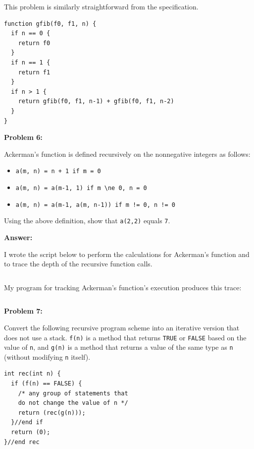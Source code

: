 \documentclass[10pt,letterpaper,final]{report}
\begin{document}
This problem is similarly straightforward from the specification.

\begin{mdframed}
\begin{verbatim}
function gfib(f0, f1, n) {
  if n == 0 {
    return f0
  }   
  if n == 1 {
    return f1
  }   
  if n > 1 {
    return gfib(f0, f1, n-1) + gfib(f0, f1, n-2)
  }       
}
\end{verbatim}
\end{mdframed}

\pagebreak
\noindent\textbf{Problem 6:}

Ackerman's function is defined recursively on the nonnegative integers as follows:
\begin{itemize}
  \item \verb|a(m, n) = n + 1 if m = 0|
  \item \verb|a(m, n) = a(m-1, 1) if m \ne 0, n = 0|
  \item \verb|a(m, n) = a(m-1, a(m, n-1)) if m != 0, n != 0|
\end{itemize}
Using the above definition, show that \verb|a(2,2)| equals \verb|7|.

\noindent\textbf{Answer:}

I wrote the script below to perform the calculations for Ackerman's function and to trace the depth of the recursive function calls.

\inputminted[breaklines=true,fontsize=\footnotesize]{python}{m3p6-ackerman.py}

\pagebreak

\noindent My program for tracking Ackerman's function's execution produces this trace:
\inputminted[breaklines=true,fontsize=\tiny]{text}{ackerman-2-2.txt}


\pagebreak
\noindent\textbf{Problem 7:}

Convert the following recursive program scheme into an iterative version that does not use a stack. \verb|f(n)| is a method that returns \verb|TRUE| or \verb|FALSE| based on the value of \verb|n|, and \verb|g(n)| is a method that returns a value of the same type as \verb|n| (without modifying \verb|n| itself).

\begin{mdframed}
\begin{verbatim}
int rec(int n) {
  if (f(n) == FALSE) {
    /* any group of statements that
    do not change the value of n */
    return (rec(g(n)));
  }//end if
  return (0);
}//end rec
\end{verbatim}
\end{mdframed}
\end{document}
